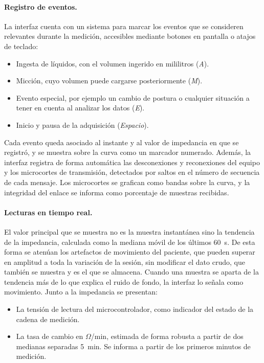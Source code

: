 \documentclass[12pt,a4paper]{article}
\begin{document}
\paragraph{Registro de eventos.} La interfaz cuenta con un sistema para marcar los eventos que se consideren relevantes durante la medición, accesibles mediante botones en pantalla o atajos de teclado:
\begin{itemize}
    \item Ingesta de líquidos, con el volumen ingerido en mililitros (\textit{A}).
    \item Micción, cuyo volumen puede cargarse posteriormente (\textit{M}).
    \item Evento especial, por ejemplo un cambio de postura o cualquier situación a tener en cuenta al analizar los datos (\textit{E}).
    \item Inicio y pausa de la adquisición (\textit{Espacio}).
\end{itemize}
Cada evento queda asociado al instante y al valor de impedancia en que se registró, y se muestra sobre la curva como un marcador numerado. Además, la interfaz registra de forma automática las desconexiones y reconexiones del equipo y los microcortes de transmisión, detectados por saltos en el número de secuencia de cada mensaje. Los microcortes se grafican como bandas sobre la curva, y la integridad del enlace se informa como porcentaje de muestras recibidas.

\paragraph{Lecturas en tiempo real.} El valor principal que se muestra no es la muestra instantánea sino la tendencia de la impedancia, calculada como la mediana móvil de los últimos 60~s. De esta forma se atenúan los artefactos de movimiento del paciente, que pueden superar en amplitud a toda la variación de la sesión, sin modificar el dato crudo, que también se muestra y es el que se almacena. Cuando una muestra se aparta de la tendencia más de lo que explica el ruido de fondo, la interfaz lo señala como movimiento. Junto a la impedancia se presentan:
\begin{itemize}
    \item La tensión de lectura del microcontrolador, como indicador del estado de la cadena de medición.
    \item La tasa de cambio en $\Omega$/min, estimada de forma robusta a partir de dos medianas separadas 5~min. Se informa a partir de los primeros minutos de medición.
\end{itemize}
\end{document}

